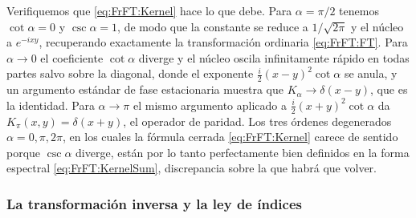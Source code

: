 			Verifiquemos que \eqref{eq:FrFT:Kernel} hace lo que debe. Para $\alpha = \pi/2$ tenemos $\cot\alpha = 0$ y $\csc\alpha = 1$, de modo que la constante se reduce a $1/\sqrt{2\pi}$ y el núcleo a $e^{-ixy}$, recuperando exactamente la transformación ordinaria \eqref{eq:FrFT:FT}. Para $\alpha\to 0$ el coeficiente $\cot\alpha$ diverge y el núcleo oscila infinitamente rápido en todas partes salvo sobre la diagonal, donde el exponente $\frac{i}{2}(x-y)^{2}\cot\alpha$ se anula, y un argumento estándar de fase estacionaria muestra que $K_{\alpha}\to\delta(x-y)$, que es la identidad. Para $\alpha\to\pi$ el mismo argumento aplicado a $\frac{i}{2}(x+y)^{2}\cot\alpha$ da $K_{\pi}(x,y) = \delta(x+y)$, el operador de paridad. Los tres órdenes degenerados $\alpha = 0,\pi,2\pi$, en los cuales la fórmula cerrada \eqref{eq:FrFT:Kernel} carece de sentido porque $\csc\alpha$ diverge, están por lo tanto perfectamente bien definidos en la forma espectral \eqref{eq:FrFT:KernelSum}, discrepancia sobre la que habrá que volver.

		\subsubsection{La transformación inversa y la ley de índices}

